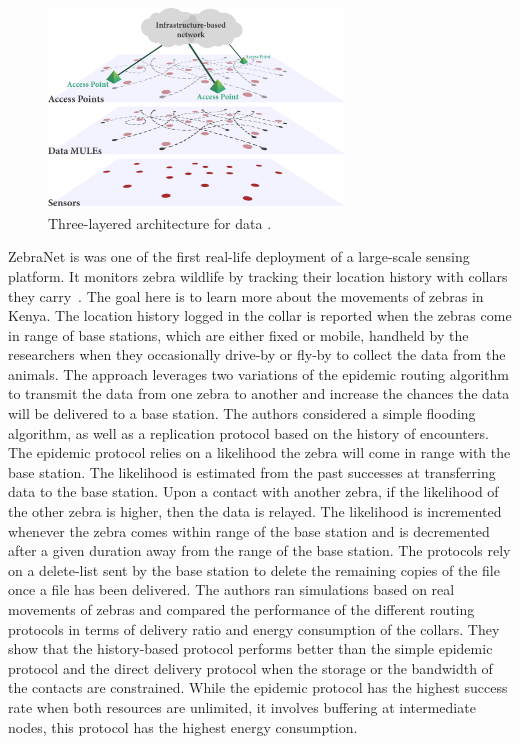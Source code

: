 \begin{figure}[h]
    \centering
    \includegraphics[width=0.7\textwidth]{figures/data-mules.pdf}
    \caption{Three-layered architecture for data .}
    \label{fig:data-mules}
\end{figure}

ZebraNet is was one of the first real-life deployment of a large-scale sensing platform. It monitors zebra wildlife by tracking their location history with collars they carry~\cite{juang2002energy}. The goal here is to learn more about the movements of zebras in Kenya. The location history logged in the collar is reported when the zebras come in range of base stations, which are either fixed or mobile, handheld by the researchers when they occasionally drive-by or fly-by to collect the data from the animals. The approach leverages two variations of the epidemic routing algorithm to transmit the data from one zebra to another and increase the chances the data will be delivered to a base station. The authors considered a simple flooding algorithm, as well as a replication protocol based on the history of encounters. The epidemic protocol relies on a likelihood the zebra will come in range with the base station. The likelihood is estimated from the past successes at transferring data to the base station. Upon a contact with another zebra, if the likelihood of the other zebra is higher, then the data is relayed. The likelihood is incremented whenever the zebra comes within range of the base station and is decremented after a given duration away from the range of the base station. The protocols rely on a delete-list sent by the base station to delete the remaining copies of the file once a file has been delivered. The authors ran simulations based on real movements of zebras and compared the performance of the different routing protocols in terms of delivery ratio and energy consumption of the collars. They show that the history-based protocol performs better than the simple epidemic protocol and the direct delivery protocol when the storage or the bandwidth of the contacts are constrained. While the epidemic protocol has the highest success rate when both resources are unlimited, it involves buffering at intermediate nodes, this protocol has the highest energy consumption.

